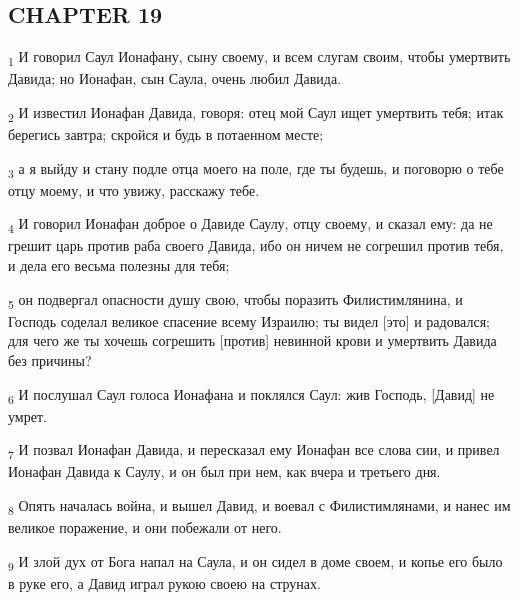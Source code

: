 \subsection{CHAPTER 19}
\begin{tcolorbox}
\textsubscript{1} И говорил Саул Ионафану, сыну своему, и всем слугам своим, чтобы умертвить Давида; но Ионафан, сын Саула, очень любил Давида.
\end{tcolorbox}
\begin{tcolorbox}
\textsubscript{2} И известил Ионафан Давида, говоря: отец мой Саул ищет умертвить тебя; итак берегись завтра; скройся и будь в потаенном месте;
\end{tcolorbox}
\begin{tcolorbox}
\textsubscript{3} а я выйду и стану подле отца моего на поле, где ты будешь, и поговорю о тебе отцу моему, и что увижу, расскажу тебе.
\end{tcolorbox}
\begin{tcolorbox}
\textsubscript{4} И говорил Ионафан доброе о Давиде Саулу, отцу своему, и сказал ему: да не грешит царь против раба своего Давида, ибо он ничем не согрешил против тебя, и дела его весьма полезны для тебя;
\end{tcolorbox}
\begin{tcolorbox}
\textsubscript{5} он подвергал опасности душу свою, чтобы поразить Филистимлянина, и Господь соделал великое спасение всему Израилю; ты видел [это] и радовался; для чего же ты хочешь согрешить [против] невинной крови и умертвить Давида без причины?
\end{tcolorbox}
\begin{tcolorbox}
\textsubscript{6} И послушал Саул голоса Ионафана и поклялся Саул: жив Господь, [Давид] не умрет.
\end{tcolorbox}
\begin{tcolorbox}
\textsubscript{7} И позвал Ионафан Давида, и пересказал ему Ионафан все слова сии, и привел Ионафан Давида к Саулу, и он был при нем, как вчера и третьего дня.
\end{tcolorbox}
\begin{tcolorbox}
\textsubscript{8} Опять началась война, и вышел Давид, и воевал с Филистимлянами, и нанес им великое поражение, и они побежали от него.
\end{tcolorbox}
\begin{tcolorbox}
\textsubscript{9} И злой дух от Бога напал на Саула, и он сидел в доме своем, и копье его было в руке его, а Давид играл рукою своею на струнах.
\end{tcolorbox}

